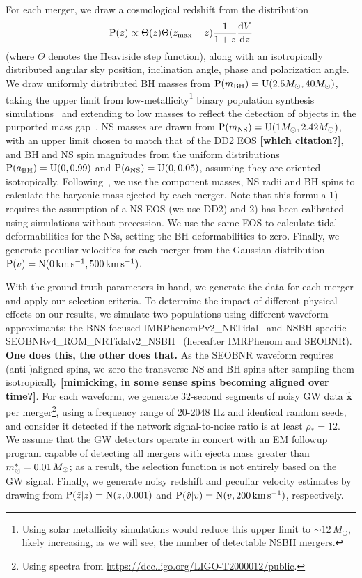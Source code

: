 \documentclass[twocolumn]{aastex63}
\newcommand{\msun}{M_\odot}
\newcommand{\vobs}{\ensuremath{\hat{v}}}
\newcommand{\zobs}{\ensuremath{\hat{z}}}
\newcommand{\zmax}{\ensuremath{z_{\rm max}}}
\newcommand{\prob}{\ensuremath{{\rm P}}}
\newcommand{\normal}{{\rm{N}}}
\newcommand{\abh}{a_{\rm BH}}
\newcommand{\ans}{a_{\rm NS}}
\newcommand{\mbh}{m_{\rm BH}}
\newcommand{\mns}{m_{\rm NS}}
\newcommand{\uniform}{{\rm U}}
\newcommand{\step}{\Theta}
\newcommand{\snrmin}{\rho_*}
\newcommand{\mejmin}{m_{\rm ej}^*}
\newcommand{\dgw}{\hat{\bm{x}}}
\newcommand{\kms}{\ensuremath{{\rm km\,s^{-1}}}}
\begin{document}
For each merger, we draw a cosmological redshift from the distribution
\begin{equation}
\prob(z) \propto \step(z) \step(\zmax-z) \frac{1}{1+z} \frac{{\rm d}V}{{\rm d}z}
\end{equation}
(where $\step$ denotes the Heaviside step function), along with an isotropically distributed angular sky position, inclination angle, phase and polarization angle. We draw uniformly distributed BH masses from $\prob(\mbh) = \uniform(2.5\msun, 40\msun)$, taking the upper limit from low-metallicity\footnote{Using solar metallicity simulations would reduce this upper limit to $\sim12\,\msun$, likely increasing, as we will see, the number of detectable NSBH mergers.}
binary population synthesis simulations~\citep{Kruckow_etal:2018} and extending to low masses to reflect the detection of objects in the purported mass gap~\citep{LVC:2020O3acat}. NS masses are drawn from $\prob(\mns) = \uniform(1\msun, 2.42\msun)$, with an upper limit chosen to match that of the DD2 EOS {\bf [which citation?]}, and BH and NS spin magnitudes from the uniform distributions $\prob(\abh) = \uniform(0, 0.99)$ and  $\prob(\ans) = \uniform(0, 0.05)$, assuming they are oriented isotropically. Following~\cite{Foucart_etal:2018}, we use the component masses, NS radii and BH spins to calculate the baryonic mass ejected by each merger. Note that this formula 1) requires the assumption of a NS EOS (we use DD2) and 2) has been calibrated using simulations without precession. We use the same EOS to calculate tidal deformabilities for the NSs, setting the BH deformabilities to zero. Finally, we generate peculiar velocities for each merger from the Gaussian distribution $\prob(v) = \normal(0\,\kms,500\,\kms)$.

With the ground truth parameters in hand, we generate the data for each merger and apply our selection criteria.  To determine the impact of different physical effects on our results, we simulate two populations using different waveform approximants: the BNS-focused IMRPhenomPv2\_NRTidal~\citep{Dietrich_etal:2019} and NSBH-specific SEOBNRv4\_ROM\_NRTidalv2\_NSBH~\citep{Matas_etal:2020} (hereafter IMRPhenom and SEOBNR). {\bf One does this, the other does that.} As the SEOBNR waveform requires (anti-)aligned spins, we zero the transverse NS and BH spins after sampling them isotropically {\bf [mimicking, in some sense spins becoming aligned over time?]}. For each waveform, we generate 32-second segments of noisy GW data $\dgw$ per merger\footnote{Using spectra from \url{https://dcc.ligo.org/LIGO-T2000012/public}.}, using a frequency range of 20-2048 Hz and identical random seeds, and consider it detected if the network signal-to-noise ratio is at least $\snrmin = 12$. We assume that the GW detectors operate in concert with an EM followup program capable of detecting all mergers with ejecta mass greater than $\mejmin = 0.01\,M_\odot$; as a result, the selection function is not entirely based on the GW signal. Finally, we generate noisy redshift and peculiar velocity estimates by drawing from $\prob(\zobs|z)=\normal(z,0.001)$ and $\prob(\vobs|v)=\normal(v,200\,\kms)$, respectively.
\end{document}
